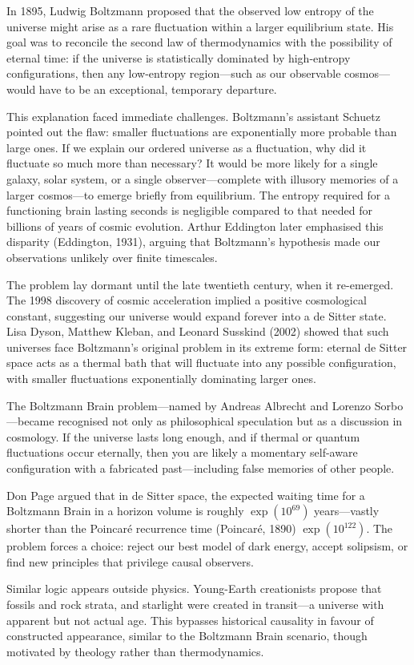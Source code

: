 \begin{historical}
In 1895, Ludwig Boltzmann proposed that the observed low entropy of the universe might arise as a rare fluctuation within a larger equilibrium state. His goal was to reconcile the second law of thermodynamics with the possibility of eternal time: if the universe is statistically dominated by high-entropy configurations, then any low-entropy region—such as our observable cosmos—would have to be an exceptional, temporary departure.

This explanation faced immediate challenges. Boltzmann's assistant Schuetz pointed out the flaw: smaller fluctuations are exponentially more probable than large ones. If we explain our ordered universe as a fluctuation, why did it fluctuate so much more than necessary? It would be more likely for a single galaxy, solar system, or a single observer—complete with illusory memories of a larger cosmos—to emerge briefly from equilibrium. The entropy required for a functioning brain lasting seconds is negligible compared to that needed for billions of years of cosmic evolution. Arthur Eddington later emphasised this disparity (Eddington, 1931), arguing that Boltzmann's hypothesis made our observations unlikely over finite timescales.

The problem lay dormant until the late twentieth century, when it re-emerged. The 1998 discovery of cosmic acceleration implied a positive cosmological constant, suggesting our universe would expand forever into a de Sitter state. Lisa Dyson, Matthew Kleban, and Leonard Susskind (2002) showed that such universes face Boltzmann's original problem in its extreme form: eternal de Sitter space acts as a thermal bath that will fluctuate into any possible configuration, with smaller fluctuations exponentially dominating larger ones.

The \QSOpen{}Boltzmann Brain\QSClose{} problem—named by Andreas Albrecht and Lorenzo Sorbo—became recognised not only as philosophical speculation but as a discussion in cosmology. If the universe lasts long enough, and if thermal or quantum fluctuations occur eternally, then you are likely a momentary self-aware configuration with a fabricated past—including false memories of other people. 

 Don Page argued that in de Sitter space, the expected waiting time for a Boltzmann Brain in a horizon volume is roughly $\exp(10^{69})$ years—vastly shorter than the Poincaré recurrence time (Poincaré, 1890) $\exp(10^{122})$. The problem forces a choice: reject our best model of dark energy, accept solipsism, or find new principles that privilege causal observers.

Similar logic appears outside physics. Young-Earth creationists propose that fossils and rock strata, and starlight were created in transit—a universe with apparent but not actual age. This bypasses historical causality in favour of constructed appearance, similar to the Boltzmann Brain scenario, though motivated by theology rather than thermodynamics.
\end{historical}
